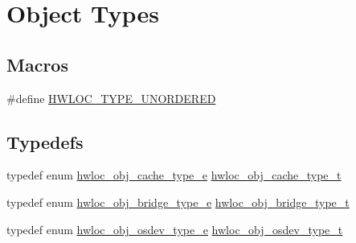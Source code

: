 \hypertarget{a00184}{}\section{Object Types}
\label{a00184}
\subsection*{Macros}
\begin{DoxyCompactItemize}
\item 
\#define \hyperlink{a00184_ga3b6e4128e9fe773863b123fa6e4a080b}{H\+W\+L\+O\+C\+\_\+\+T\+Y\+P\+E\+\_\+\+U\+N\+O\+R\+D\+E\+R\+ED}
\end{DoxyCompactItemize}
\subsection*{Typedefs}
\begin{DoxyCompactItemize}
\item 
typedef enum \hyperlink{a00184_ga791c9875c8fe20f3e1e5871e0657e59b}{hwloc\+\_\+obj\+\_\+cache\+\_\+type\+\_\+e} \hyperlink{a00184_gab6e1e7efedae8b341f3ee14fbe53d66c}{hwloc\+\_\+obj\+\_\+cache\+\_\+type\+\_\+t}
\item 
typedef enum \hyperlink{a00184_ga48a4803c72574191d7ead1c62aaf9860}{hwloc\+\_\+obj\+\_\+bridge\+\_\+type\+\_\+e} \hyperlink{a00184_ga0a947e8c5adcc729b126bd09c01a0153}{hwloc\+\_\+obj\+\_\+bridge\+\_\+type\+\_\+t}
\item 
typedef enum \hyperlink{a00184_ga64f5d539df299c97ae80ce53fc4b56c0}{hwloc\+\_\+obj\+\_\+osdev\+\_\+type\+\_\+e} \hyperlink{a00184_ga90c1e82a60ba5871d07645169e636987}{hwloc\+\_\+obj\+\_\+osdev\+\_\+type\+\_\+t}
\end{DoxyCompactItemize}
